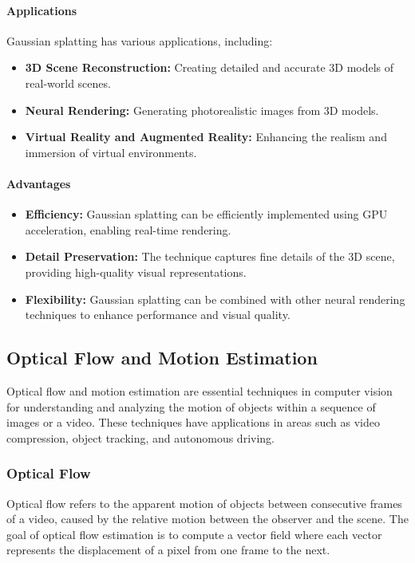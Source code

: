 \documentclass[12pt]{article}
\begin{document}
\paragraph{Applications}

Gaussian splatting has various applications, including:
\begin{itemize}
    \item \textbf{3D Scene Reconstruction:} Creating detailed and accurate 3D models of real-world scenes.
    \item \textbf{Neural Rendering:} Generating photorealistic images from 3D models.
    \item \textbf{Virtual Reality and Augmented Reality:} Enhancing the realism and immersion of virtual environments.
\end{itemize}

\paragraph{Advantages}

\begin{itemize}
    \item \textbf{Efficiency:} Gaussian splatting can be efficiently implemented using GPU acceleration, enabling real-time rendering.
    \item \textbf{Detail Preservation:} The technique captures fine details of the 3D scene, providing high-quality visual representations.
    \item \textbf{Flexibility:} Gaussian splatting can be combined with other neural rendering techniques to enhance performance and visual quality.
\end{itemize}


\subsection{Optical Flow and Motion Estimation}

Optical flow and motion estimation are essential techniques in computer vision for understanding and analyzing the motion of objects within a sequence of images or a video. These techniques have applications in areas such as video compression, object tracking, and autonomous driving.

\subsubsection{Optical Flow}

Optical flow refers to the apparent motion of objects between consecutive frames of a video, caused by the relative motion between the observer and the scene. The goal of optical flow estimation is to compute a vector field where each vector represents the displacement of a pixel from one frame to the next.
\end{document}
